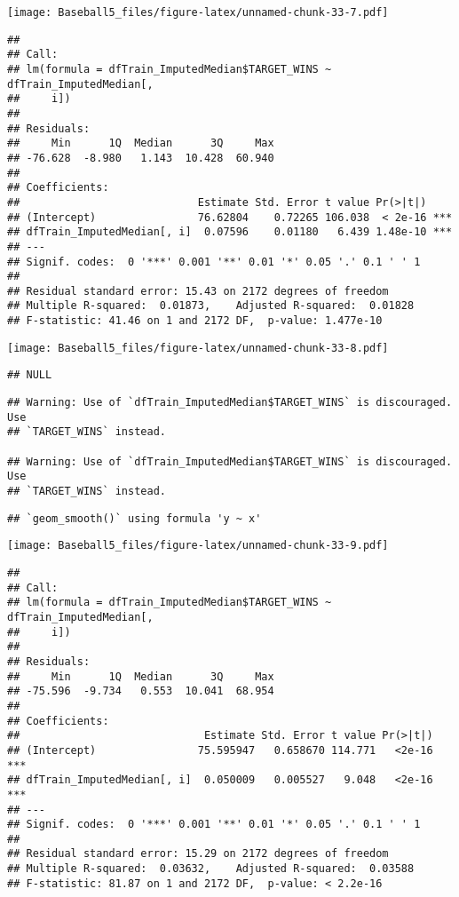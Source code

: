 \documentclass[
]{article}
\begin{document}
\texttt{[image: Baseball5\_files/figure-latex/unnamed-chunk-33-7.pdf]}

\begin{verbatim}
## 
## Call:
## lm(formula = dfTrain_ImputedMedian$TARGET_WINS ~ dfTrain_ImputedMedian[, 
##     i])
## 
## Residuals:
##     Min      1Q  Median      3Q     Max 
## -76.628  -8.980   1.143  10.428  60.940 
## 
## Coefficients:
##                            Estimate Std. Error t value Pr(>|t|)    
## (Intercept)                76.62804    0.72265 106.038  < 2e-16 ***
## dfTrain_ImputedMedian[, i]  0.07596    0.01180   6.439 1.48e-10 ***
## ---
## Signif. codes:  0 '***' 0.001 '**' 0.01 '*' 0.05 '.' 0.1 ' ' 1
## 
## Residual standard error: 15.43 on 2172 degrees of freedom
## Multiple R-squared:  0.01873,    Adjusted R-squared:  0.01828 
## F-statistic: 41.46 on 1 and 2172 DF,  p-value: 1.477e-10
\end{verbatim}

\texttt{[image: Baseball5\_files/figure-latex/unnamed-chunk-33-8.pdf]}

\begin{verbatim}
## NULL
\end{verbatim}

\begin{verbatim}
## Warning: Use of `dfTrain_ImputedMedian$TARGET_WINS` is discouraged. Use
## `TARGET_WINS` instead.

## Warning: Use of `dfTrain_ImputedMedian$TARGET_WINS` is discouraged. Use
## `TARGET_WINS` instead.
\end{verbatim}

\begin{verbatim}
## `geom_smooth()` using formula 'y ~ x'
\end{verbatim}

\texttt{[image: Baseball5\_files/figure-latex/unnamed-chunk-33-9.pdf]}

\begin{verbatim}
## 
## Call:
## lm(formula = dfTrain_ImputedMedian$TARGET_WINS ~ dfTrain_ImputedMedian[, 
##     i])
## 
## Residuals:
##     Min      1Q  Median      3Q     Max 
## -75.596  -9.734   0.553  10.041  68.954 
## 
## Coefficients:
##                             Estimate Std. Error t value Pr(>|t|)    
## (Intercept)                75.595947   0.658670 114.771   <2e-16 ***
## dfTrain_ImputedMedian[, i]  0.050009   0.005527   9.048   <2e-16 ***
## ---
## Signif. codes:  0 '***' 0.001 '**' 0.01 '*' 0.05 '.' 0.1 ' ' 1
## 
## Residual standard error: 15.29 on 2172 degrees of freedom
## Multiple R-squared:  0.03632,    Adjusted R-squared:  0.03588 
## F-statistic: 81.87 on 1 and 2172 DF,  p-value: < 2.2e-16
\end{verbatim}
\end{document}

